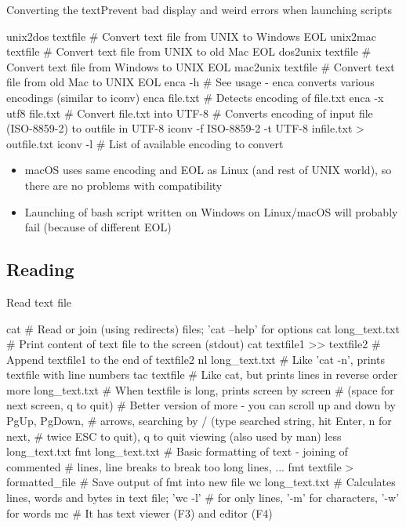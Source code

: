 \documentclass[compress, ucs, xelatex, 11pt, xcolor=svgnames, aspectratio=169,
	hyperref={
		bookmarks=true,
		unicode=true,
		colorlinks=true,
		pdftitle={Linux, command line and MetaCentrum},
		plainpages=false,
		pdfauthor={Vojtech Zeisek},
		pdfsubject={Course about use of Linux command line, writing shell scripts and using MetaCentrum of CESNET},
		pdfcreator={XeLaTeX},
		pdfkeywords={Linux, GNU, BASH, shell, command line, MetaCentrum},
		linkcolor=DarkRed, %
		anchorcolor=DarkBlue, %
		citecolor=Indigo, %
		filecolor=NavyBlue, %
		menucolor=DarkMagenta, %
		urlcolor=DarkBlue, %
		pdftex},
	url={hyphens, lowtilde} %
	]{beamer}
\begin{document}
\begin{frame}[fragile]{Converting the text}{Prevent bad display and weird errors when launching scripts}
	\label{eolencoding}
	\begin{bashcode}
    unix2dos textfile # Convert text file from UNIX to Windows EOL
    unix2mac textfile # Convert text file from UNIX to old Mac EOL
    dos2unix textfile # Convert text file from Windows to UNIX EOL
    mac2unix textfile # Convert text file from old Mac to UNIX EOL
    enca -h # See usage - enca converts various encodings (similar to iconv)
    enca file.txt # Detects encoding of file.txt
    enca -x utf8 file.txt # Convert file.txt into UTF-8
    # Converts encoding of input file (ISO-8859-2) to outfile in UTF-8
    iconv -f ISO-8859-2 -t UTF-8 infile.txt > outfile.txt
    iconv -l # List of available encoding to convert
	\end{bashcode}
	\begin{itemize}
		\item macOS uses same encoding and EOL as Linux (and rest of UNIX world), so there are no problems with compatibility
		\item Launching of bash script written on Windows on Linux/macOS will probably fail (because of different EOL)
	\end{itemize}
\end{frame}

\subsection{Reading}

\begin{frame}[fragile]{Read text file}
	\begin{bashcode}
    cat # Read or join (using redirects) files; 'cat --help' for options
    cat long_text.txt # Print content of text file to the screen (stdout)
    cat textfile1 >> textfile2 # Append textfile1 to the end of textfile2
    nl long_text.txt # Like 'cat -n', prints textfile with line numbers
    tac textfile # Like cat, but prints lines in reverse order
    more long_text.txt # When textfile is long, prints screen by screen
                       # (space for next screen, q to quit)
    # Better version of more - you can scroll up and down by PgUp, PgDown,
    # arrows, searching by / (type searched string, hit Enter, n for next,
    # twice ESC to quit), q to quit viewing (also used by man)
    less long_text.txt
    fmt long_text.txt # Basic formatting of text - joining of commented
                      # lines, line breaks to break too long lines, ...
    fmt textfile > formatted_file # Save output of fmt into new file
    wc long_text.txt # Calculates lines, words and bytes in text file; 'wc -l'
                     # for only lines, '-m' for characters, '-w' for words
    mc # It has text viewer (F3) and editor (F4)
	\end{bashcode}
\end{frame}
\end{document}

